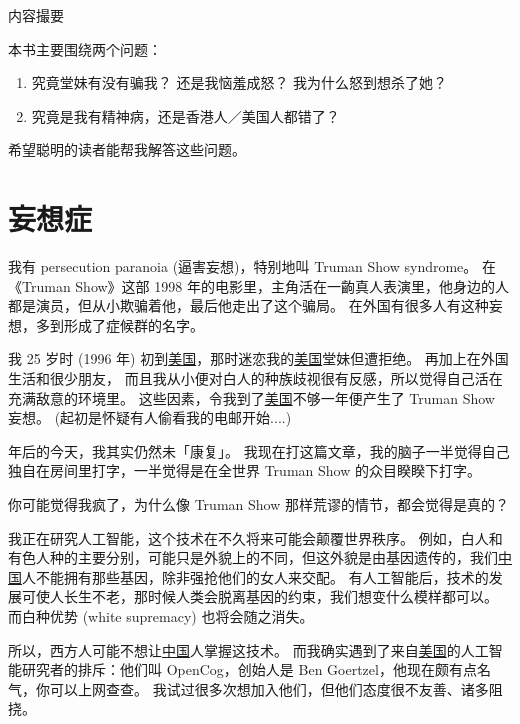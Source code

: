 \documentclass[12pt]{report}
\begin{document}
\vspace{3cm}

\begin{center}
{\Large 内容撮要}\par
\vspace{0.5cm}

\parbox{0.8\textwidth}{
本书主要围绕两个问题：\par

\begin{enumerate}
\item 究竟堂妹有没有骗我？ 还是我恼羞成怒？ 我为什么怒到想杀了她？ 
\item 究竟是我有精神病，还是香港人／美国人都错了？
\end{enumerate}

希望聪明的读者能帮我解答这些问题。
}
\end{center}

\tableofcontents

\chapter{妄想症}

我有 persecution paranoia (逼害妄想)，特别地叫 Truman Show syndrome。 在《Truman Show》这部 1998 年的电影里，主角活在一齣真人表演里，他身边的人都是演员，但从小欺骗着他，最后他走出了这个骗局。 在外国有很多人有这种妄想，多到形成了症候群的名字。

我 25 岁时 (1996 年) 初到\uline{美国}，那时迷恋我的\uline{美国}堂妹但遭拒绝。 再加上在外国生活和很少朋友， 而且我从小便对白人的种族歧视很有反感，所以觉得自己活在充满敌意的环境里。 这些因素，令我到了\uline{美国}不够一年便产生了 Truman Show 妄想。 (起初是怀疑有人偷看我的电邮开始....)

\resultb 年后的今天，我其实仍然未「康复」。 我现在打这篇文章，我的脑子一半觉得自己独自在房间里打字，一半觉得是在全世界 Truman Show 的众目睽睽下打字。

你可能觉得我疯了，为什么像 Truman Show 那样荒谬的情节，都会觉得是真的？

我正在研究人工智能，这个技术在不久将来可能会颠覆世界秩序。 例如，白人和有色人种的主要分别，可能只是外貌上的不同，但这外貌是由基因遗传的，我们\uline{中国}人不能拥有那些基因，除非强抢他们的女人来交配。 有人工智能后，技术的发展可使人长生不老，那时候人类会脱离基因的约束，我们想变什么模样都可以。 而白种优势 (white supremacy) 也将会随之消失。

所以，西方人可能不想让\uline{中国}人掌握这技术。 而我确实遇到了来自\uline{美国}的人工智能研究者的排斥：他们叫 OpenCog，创始人是 Ben Goertzel，他现在颇有点名气，你可以上网查查。 我试过很多次想加入他们，但他们态度很不友善、诸多阻挠。
\end{document}
